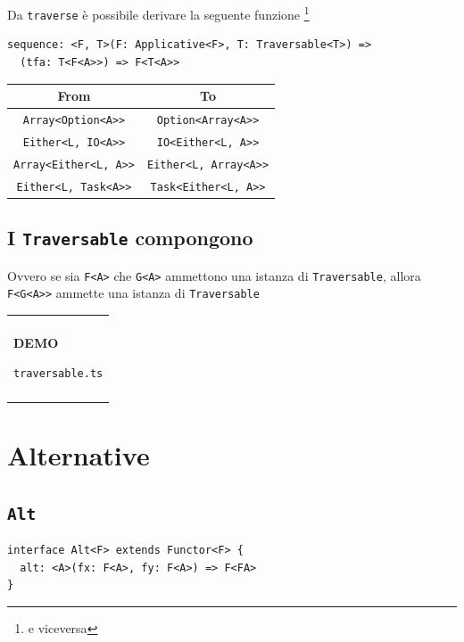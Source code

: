 \documentclass[12pt]{article}
\newenvironment{demo}
    {\begin{center}
    \begin{tabular}{|p{0.9\textwidth}|}
    \hline\\
    }
    {
    \\\\\hline
    \end{tabular}
    \end{center}
    }
\begin{document}
Da \texttt{traverse} è possibile derivare la seguente funzione \footnote{e viceversa}

\begin{verbatim}
sequence: <F, T>(F: Applicative<F>, T: Traversable<T>) =>
  (tfa: T<F<A>>) => F<T<A>>
\end{verbatim}

\begin{center}
\bgroup
\def\arraystretch{1.5}
\begin{tabular}{ |c|c| }
\hline
From & To \\
\hline
\texttt{Array<Option<A>>} & \texttt{Option<Array<A>>} \\
\hline
\texttt{Either<L, IO<A>>} & \texttt{IO<Either<L, A>>} \\
\hline
\texttt{Array<Either<L, A>>} & \texttt{Either<L, Array<A>>} \\
\hline
\texttt{Either<L, Task<A>>} & \texttt{Task<Either<L, A>>} \\
\hline
\end{tabular}
\egroup
\end{center}

\subsection{I \texttt{Traversable} compongono}

Ovvero se sia \texttt{F<A>} che \texttt{G<A>} ammettono una istanza di \texttt{Traversable}, allora \texttt{F<G<A>>} ammette una istanza di \texttt{Traversable}

\begin{demo}
\begin{center}
\textbf{DEMO}

\texttt{traversable.ts}
\end{center}
\end{demo}

\newpage

\section{Alternative}

\subsection{\texttt{Alt}}

\begin{verbatim}
interface Alt<F> extends Functor<F> {
  alt: <A>(fx: F<A>, fy: F<A>) => F<FA>
}
\end{verbatim}
\end{document}
